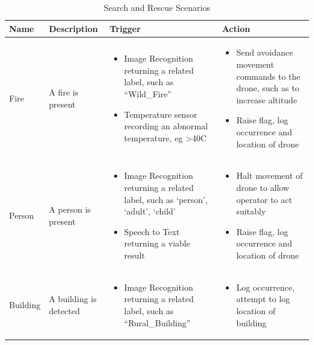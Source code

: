 \documentclass{article}
\begin{document}
\begin{table}[h]
\caption{Search and Rescue Scenarios\label{scenarios}}
\hyphenchar{}
\centering
\begin{tabularx}{\textwidth}{| >{\centering}m{1.5cm} | >{\centering}m{2cm} | X | X |}
    \hline
    Name & Description & Trigger & Action \\ \hline
    Fire & \vspace{\baselineskip} A fire is present &
    \begin{itemize}[topsep=0pt, leftmargin=0cm,itemindent=.5cm,labelwidth=\itemindent,labelsep=0cm,align=left]
        \item Image Recognition returning a related label, such as “Wild\_Fire”
        \item Temperature sensor recording an abnormal temperature, eg >40C
    \end{itemize} &
    \begin{itemize} [topsep=0pt, leftmargin=0cm,itemindent=.5cm,labelwidth=\itemindent,labelsep=0cm,align=left]
        \item Send avoidance movement commands to the drone, such as to increase altitude
        \item Raise flag, log occurrence and location of drone
    \end{itemize} \\ \hline

    Person & \vspace{\baselineskip} A person is present &
    \begin{itemize} [topsep=0pt, leftmargin=0cm,itemindent=.5cm,labelwidth=\itemindent,labelsep=0cm,align=left]
        \item Image Recognition returning a related label, such as `person', `adult', `child'
        \item Speech to Text returning a viable result
    \end{itemize} &
    \begin{itemize} [topsep=0pt, leftmargin=0cm,itemindent=.5cm,labelwidth=\itemindent,labelsep=0cm,align=left]
        \item Halt movement of drone to allow operator to act suitably
        \item Raise flag, log occurrence and location of drone
    \end{itemize} \\ \hline

    Building & \vspace{\baselineskip} A building is detected &
    \begin{itemize} [topsep=0pt, leftmargin=0cm,itemindent=.5cm,labelwidth=\itemindent,labelsep=0cm,align=left]
        \item Image Recognition returning a related label, such as “Rural\_Building”
    \end{itemize} &
    \begin{itemize} [topsep=0pt, leftmargin=0cm,itemindent=.5cm,labelwidth=\itemindent,labelsep=0cm,align=left]
        \item Log occurrence, attempt to log location of building
    \end{itemize} \\ \hline


\end{tabularx}
\end{table}
\end{document}
